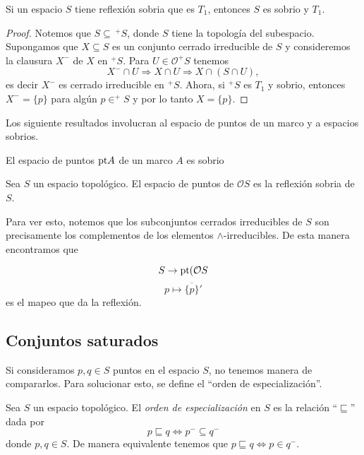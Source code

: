 \begin{lem}
    Si un espacio $S$ tiene reflexión sobria que es $T_1$, entonces $S$ es sobrio y $T_1$.
\end{lem}

\begin{proof}
    Notemos que $S\subseteq\, ^+S$, donde $S$ tiene la topología del subespacio. Supongamos que $X\subseteq S$ es un conjunto cerrado irreducible de $S$ y consideremos la clausura $X^-$ de $X$ en $^+S$. Para $U\in \mathcal{O}^+S$ tenemos
    \[
    X^{-}\cap U\Rightarrow X\cap U\Rightarrow X\cap (S\cap U),
    \]
    es decir $X^-$ es cerrado irreducible en $^+S$. Ahora, si $^+S$ es $T_1$ y sobrio, entonces $X^{-}=\{p\}$ para algún $p\in ^+S$ y por lo tanto $X=\{p\}$.
\end{proof}

Los siguiente resultados involucran al espacio de puntos de un marco y a espacios sobrios.
\begin{lem}
    El espacio de puntos $\mathrm{pt} A$ de un marco $A$ es sobrio
\end{lem}

\begin{lem}
    Sea $S$ un espacio topológico. El espacio de puntos de $\mathcal{O}S$ es la reflexión sobria de $S$.
\end{lem}

Para ver esto, notemos que los subconjuntos cerrados irreducibles de $S$ son precisamente los complementos de los elementos $\wedge$-irreducibles. De esta manera encontramos que 

\[
S\to \mathrm{pt}(\mathcal{O}S
\]
\[
p\mapsto \overline{\{p\}}'
\]
es el mapeo que da la reflexión.

\subsection{Conjuntos saturados}\label{Conjuntos saturados}

Si consideramos $p, q\in S$ puntos en el espacio $S$, no tenemos manera de compararlos. Para solucionar esto, se define el ``orden de especialización''.

\begin{dfn}\label{O. especializacion}
    Sea $S$ un espacio topológico. El \emph{orden de especialización} en $S$ es la relación ``$\sqsubseteq$'' dada por 
    \[
    p\sqsubseteq q \Leftrightarrow p^- \subseteq q^-
    \]
    donde $p, q\in S$. De manera equivalente tenemos que $ p\sqsubseteq q \Leftrightarrow p\in q^-$.
\end{dfn}

